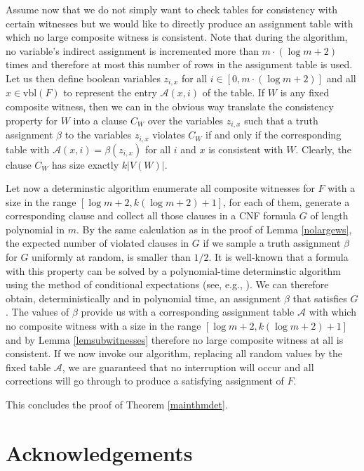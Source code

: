 \documentclass[11pt,a4paper]{article}
\begin{document}
Assume now that we do not simply want to check tables for consistency with certain witnesses but we would like to directly
produce an assignment table with which no large composite witness is consistent. Note that during the algorithm, no variable's
indirect assignment is incremented more than $m \cdot (\log m + 2)$ times and therefore at most this number of rows in the
assignment table is used. Let us then define boolean variables $z_{i,x}$ for all $i \in [0, m \cdot (\log m + 2)]$ and all
$x \in \mbox{vbl}(F)$ to represent the entry $\mathcal{A}(x,i)$ of the table. If $W$ is any fixed composite witness, then
we can in the obvious way translate the consistency property for $W$ into a clause $C_W$ over the variables $z_{i,x}$ such
that a truth assignment $\beta$ to the variables $z_{i,x}$ violates $C_W$ if and only if the corresponding table with
$\mathcal{A}(x,i) = \beta(z_{i,x})$ for all $i$ and $x$ is consistent with $W$. Clearly, the clause $C_W$ has size exactly
$k|V(W)|$.

Let now a determinstic algorithm enumerate all composite witnesses for $F$ with a size in the range 
$[\log m + 2, k(\log m + 2) + 1]$, for each of them, generate a corresponding clause and collect all those clauses
in a CNF formula $G$ of length polynomial in $m$. By the same calculation as in the proof of Lemma \ref{nolargews}, 
the expected number of violated clauses in $G$ if we sample a truth assignment $\beta$ for $G$ uniformly at random, is smaller
than $1/2$. It is well-known that a formula with this property can be solved by a polynomial-time determinstic
algorithm using the method of conditional expectations (see, e.g., \cite{Bec91}). 
We can therefore obtain, deterministically and in polynomial time,
an assignment $\beta$ that satisfies $G$. The values of $\beta$ provide us with a corresponding assignment table
$\mathcal{A}$ with which no composite witness with a size in the range $[\log m + 2, k(\log m + 2) + 1]$ and by Lemma
\ref{lemsubwitnesses} therefore no large composite witness at all is consistent. If we now invoke our algorithm, replacing
all random values by the fixed table $\mathcal{A}$, we are guaranteed that no interruption will occur and
all corrections will go through to produce a satisfying assignment of $F$.

This concludes the proof of Theorem \ref{mainthmdet}.

\section*{Acknowledgements}
\end{document}
